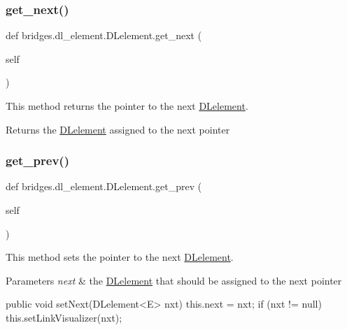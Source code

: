 \subsubsection{\texorpdfstring{get\+\_\+next()}{get\_next()}}
{\footnotesize\ttfamily def bridges.\+dl\+\_\+element.\+D\+Lelement.\+get\+\_\+next (\begin{DoxyParamCaption}\item[{}]{self }\end{DoxyParamCaption})}



This method returns the pointer to the next \mbox{\hyperlink{classbridges_1_1dl__element_1_1_d_lelement}{D\+Lelement}}. 

\begin{DoxyReturn}{Returns}
the \mbox{\hyperlink{classbridges_1_1dl__element_1_1_d_lelement}{D\+Lelement}} assigned to the next pointer 
\end{DoxyReturn}
\mbox{\label{classbridges_1_1dl__element_1_1_d_lelement_ab27fc6bf6e583eef2c8c9f021a3a9ad0}} 
\subsubsection{\texorpdfstring{get\+\_\+prev()}{get\_prev()}}
{\footnotesize\ttfamily def bridges.\+dl\+\_\+element.\+D\+Lelement.\+get\+\_\+prev (\begin{DoxyParamCaption}\item[{}]{self }\end{DoxyParamCaption})}



This method sets the pointer to the next \mbox{\hyperlink{classbridges_1_1dl__element_1_1_d_lelement}{D\+Lelement}}. 


\begin{DoxyParams}{Parameters}
{\em next} & the \mbox{\hyperlink{classbridges_1_1dl__element_1_1_d_lelement}{D\+Lelement}} that should be assigned to the next pointer\\
\hline
\end{DoxyParams}
\begin{DoxyVerb}    public void setNext(DLelement<E> nxt) {
        this.next = nxt;
        if (nxt != null)
            this.setLinkVisualizer(nxt);
    }
\end{DoxyVerb}


